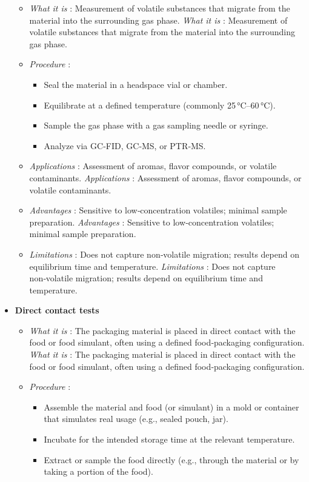 \documentclass[11pt,a4paper]{article}
\begin{document}
\begin{itemize}
\begin{itemize}
\item \textit{What it is} : Measurement of volatile substances that migrate from the material into the surrounding gas phase.
\textit{What it is} : Measurement of volatile substances that migrate from the material into the surrounding gas phase.
\item 
\textit{Procedure} :
    \begin{itemize}
\item Seal the material in a headspace vial or chamber.
\item Equilibrate at a defined temperature (commonly 25 °C–60 °C).
\item Sample the gas phase with a gas sampling needle or syringe.
\item Analyze via GC‑FID, GC‑MS, or PTR‑MS.
    \end{itemize}
\item \textit{Applications} : Assessment of aromas, flavor compounds, or volatile contaminants.
\textit{Applications} : Assessment of aromas, flavor compounds, or volatile contaminants.
\item \textit{Advantages} : Sensitive to low‑concentration volatiles; minimal sample preparation.
\textit{Advantages} : Sensitive to low‑concentration volatiles; minimal sample preparation.
\item \textit{Limitations} : Does not capture non‑volatile migration; results depend on equilibrium time and temperature.
\textit{Limitations} : Does not capture non‑volatile migration; results depend on equilibrium time and temperature.
  \end{itemize}
\item 
\textbf{Direct contact tests}
  \begin{itemize}
\item \textit{What it is} : The packaging material is placed in direct contact with the food or food simulant, often using a defined food‑packaging configuration.
\textit{What it is} : The packaging material is placed in direct contact with the food or food simulant, often using a defined food‑packaging configuration.
\item 
\textit{Procedure} :
    \begin{itemize}
\item Assemble the material and food (or simulant) in a mold or container that simulates real usage (e.g., sealed pouch, jar).
\item Incubate for the intended storage time at the relevant temperature.
\item Extract or sample the food directly (e.g., through the material or by taking a portion of the food).

\end{itemize}
\end{itemize}
\end{itemize}
\end{document}
